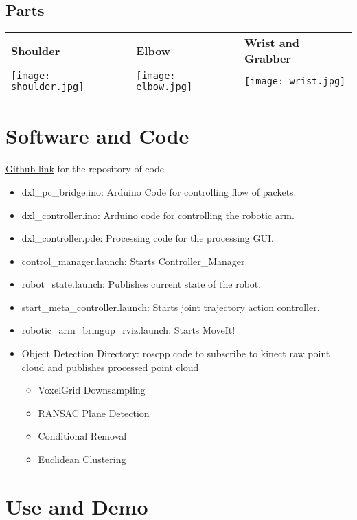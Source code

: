\documentclass[a4paper,12pt,oneside]{book}
\begin{document}
	
	\pagebreak
	
	\subsection*{Parts}
	\begin{tabular} { p{118pt}  p{118pt}  p{118pt} }
		\textbf{Shoulder} & \textbf{Elbow} & \textbf{Wrist and Grabber} \\
		\texttt{[image: shoulder.jpg]}&
		\texttt{[image: elbow.jpg]}&
		\texttt{[image: wrist.jpg]}
	\end{tabular}
	
	
	\section{Software and Code}
	\href{http://www.github.com}{Github link} for the repository of code
	\begin{itemize}
		\item dxl\_pc\_bridge.ino: Arduino Code for controlling flow of packets.
		\item dxl\_controller.ino: Arduino code for controlling the robotic arm.
		\item dxl\_controller.pde: Processing code for the processing GUI.
		\item control\_manager.launch: Starts Controller\_Manager
		\item robot\_state.launch: Publishes current state of the robot.
		\item start\_meta\_controller.launch: Starts joint trajectory action controller.
		\item robotic\_arm\_bringup\_rviz.launch: Starts MoveIt!
		\item Object Detection Directory: roscpp code to subscribe to kinect raw point cloud and publishes processed point cloud
		\begin{itemize}
			\item VoxelGrid Downsampling
			\item RANSAC Plane Detection
			\item Conditional Removal
			\item Euclidean Clustering
		\end{itemize}
	\end{itemize}
	
	\pagebreak
	\section{Use and Demo}
\end{document}
